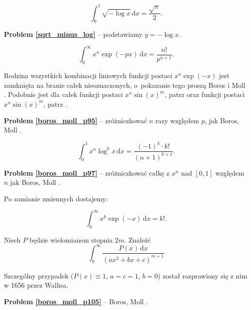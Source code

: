 \begin{problem_with_solution}
\label{sqrt_minus_log}%
    \begin{equation}
        \int_{0}^1 \sqrt{- \log x} \,\mathrm{d} x = \frac{\sqrt \pi}{2}.
    \end{equation}
\end{problem_with_solution}

\textbf{Problem \ref{sqrt_minus_log}} -- podstawiamy $y = - \log x$.

\begin{problem_with_solution}
    \label{boros_moll_p95}%
    \begin{equation}
        \int_0^\infty x^n \exp (-px) \,\mathrm{d}x = \frac{n!}{p^{n+1}}.
    \end{equation}
\end{problem_with_solution}

Rodzina wszystkich kombinacji liniowych funkcji postaci $x^n \exp (-x)$ jest zamknięta na branie całek nieoznaczonych, o~pokazanie tego proszą Boros i Moll \cite[s. 103]{boros04}.
Podobnie jest dla całek funkcji postaci $x^n \sin(x)^m$, patrz \cite[s. 135]{boros04} oraz funkcji postaci  $x^n \sin(x)^m$, patrz  \cite[s. 136]{boros04}. %

\textbf{Problem \ref{boros_moll_p95}} -- zróżniczkować $n$ razy względem $p$, jak Boros, Moll \cite[s. 95]{boros04}.

\begin{problem_with_solution}
    \label{boros_moll_p97}%
    \begin{equation}
        \int_0^1 x^n \log^k x \,\mathrm{d}x = \frac{(-1)^k \cdot k!}{(n+1)^{k+1}}.
    \end{equation}
\end{problem_with_solution}

\textbf{Problem \ref{boros_moll_p97}} -- zróżniczkować całkę z $x^n$ nad $[0, 1]$ względem $n$ jak Boros, Moll \cite[s. 97]{boros04}.

Po zamianie zmiennych dostajemy:

\begin{problem}
    \begin{equation}
        \int_0^\infty x^k \exp (-x) \,\mathrm{d}x = k!.
    \end{equation}
\end{problem}


\begin{problem_with_solution}
    Niech $P$ będzie wielomianem stopnia $2m$. Znaleźć
    \label{boros_moll_p105}%
    \begin{equation}
        \int_0^\infty \frac{P(x) \,\mathrm{d}x}{(ax^2 + bx + c)^{m+1}}
    \end{equation}
\end{problem_with_solution}

Szczególny przypadek ($P(x) \equiv 1$, $a = c = 1$, $b = 0$) został rozprawiony się z nim w 1656 przez Wallisa.

\textbf{Problem \ref{boros_moll_p105}} -- Boros, Moll \cite[s. 105--koniecrozdziału6]{boros04}.
